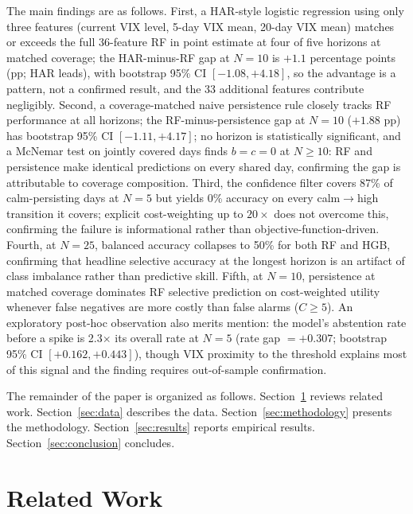 \documentclass[12pt]{article}
\begin{document}
The main findings are as follows. First, a HAR-style logistic regression using only three features (current VIX level, 5-day VIX mean, 20-day VIX mean) matches or exceeds the full 36-feature RF in point estimate at four of five horizons at matched coverage; the HAR-minus-RF gap at $N = 10$ is $+1.1$ percentage points (pp; HAR leads), with bootstrap 95\% CI $[-1.08, +4.18]$, so the advantage is a pattern, not a confirmed result, and the 33 additional features contribute negligibly. Second, a coverage-matched naive persistence rule closely tracks RF performance at all horizons; the RF-minus-persistence gap at $N = 10$ ($+1.88$ pp) has bootstrap 95\% CI $[-1.11, +4.17]$; no horizon is statistically significant, and a McNemar test on jointly covered days finds $b = c = 0$ at $N \geq 10$: RF and persistence make identical predictions on every shared day, confirming the gap is attributable to coverage composition. Third, the confidence filter covers 87\% of calm-persisting days at $N = 5$ but yields 0\% accuracy on every calm$\to$high transition it covers; explicit cost-weighting up to $20{\times}$ does not overcome this, confirming the failure is informational rather than objective-function-driven. Fourth, at $N = 25$, balanced accuracy collapses to 50\% for both RF and HGB, confirming that headline selective accuracy at the longest horizon is an artifact of class imbalance rather than predictive skill. Fifth, at $N = 10$, persistence at matched coverage dominates RF selective prediction on cost-weighted utility whenever false negatives are more costly than false alarms ($C \geq 5$). An exploratory post-hoc observation also merits mention: the model's abstention rate before a spike is 2.3$\times$ its overall rate at $N = 5$ (rate gap $= +0.307$; bootstrap 95\% CI $[+0.162, +0.443]$), though VIX proximity to the threshold explains most of this signal and the finding requires out-of-sample confirmation.

The remainder of the paper is organized as follows. Section~\ref{sec:related} reviews related work. Section~\ref{sec:data} describes the data. Section~\ref{sec:methodology} presents the methodology. Section~\ref{sec:results} reports empirical results. Section~\ref{sec:conclusion} concludes.

\section{Related Work}
\label{sec:related}
\end{document}
